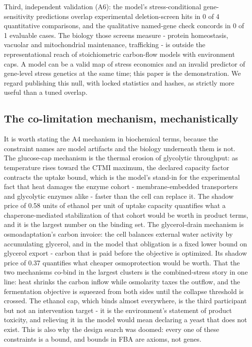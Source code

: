 \documentclass[12pt]{article}
\begin{document}
Third, independent validation (A6): the model's stress-conditional
gene-sensitivity predictions overlap experimental deletion-screen hits
in 0 of 4 quantitative comparisons, and the qualitative named-gene
check concords in 0 of 1 evaluable cases. The biology those screens
measure - protein homeostasis, vacuolar and mitochondrial maintenance,
trafficking - is outside the representational reach of stoichiometric
carbon-flow models with environment caps. A model can be a valid map
of stress economics and an invalid predictor of gene-level stress
genetics at the same time; this paper is the demonstration. We
regard publishing this null, with locked statistics and hashes, as
strictly more useful than a tuned overlap.


\subsection{The co-limitation mechanism, mechanistically}

It is worth stating the A4 mechanism in biochemical terms, because the
constraint names are model artifacts and the biology underneath them
is not. The glucose-cap mechanism is the thermal erosion of glycolytic
throughput: as temperature rises toward the CTMI maximum, the
declared capacity factor contracts the uptake bound, which is the
model's stand-in for the experimental fact that heat damages the
enzyme cohort - membrane-embedded transporters and glycolytic enzymes
alike - faster than the cell can replace it. The shadow price of 0.58
units of ethanol per unit of uptake capacity quantifies what a
chaperone-mediated stabilization of that cohort would be worth in
product terms, and it is the largest number on the binding set. The
glycerol-drain mechanism is osmoadaptation's carbon invoice: the cell
balances external water activity by accumulating glycerol, and in the
model that obligation is a fixed lower bound on glycerol export -
carbon that is paid before the objective is optimized. Its shadow
price of 0.37 quantifies what cheaper osmoprotection would be worth.
That the two mechanisms co-bind in the largest clusters is the
combined-stress story in one line: heat shrinks the carbon inflow
while osmolarity taxes the outflow, and the fermentation objective is
squeezed from both sides until the collapse threshold is crossed. The
ethanol cap, which binds almost everywhere, is the third participant
but not an intervention target - it is the environment's statement of
product toxicity, and relieving it in the model would mean declaring
a yeast that does not exist. This is also why the design search was
doomed: every one of these constraints is a bound, and bounds in FBA
are axioms, not genes.
\end{document}
